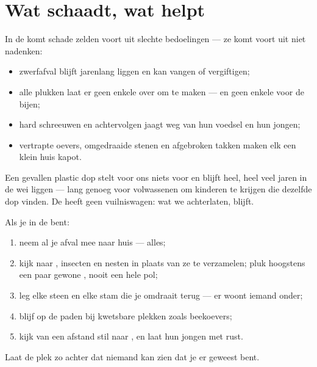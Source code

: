 \section{Wat schaadt, wat helpt}

\begin{proposition}\label{prop:g2:caring-for-nature:harm}
In de  komt schade zelden voort uit slechte bedoelingen --- ze
komt voort uit niet nadenken:
\begin{itemize}
  \item zwerfafval blijft jarenlang liggen en kan  vangen of vergiftigen;
  \item alle  plukken laat er geen enkele over om  te maken
        --- en geen enkele voor de bijen;
  \item hard schreeuwen en achtervolgen jaagt  weg van hun
        voedsel en hun jongen;
  \item vertrapte oevers, omgedraaide stenen en afgebroken takken maken
        elk een klein huis kapot.
\end{itemize}
\end{proposition}
\admitted

\begin{example}[De flesdop]\label{ex:g2:caring-for-nature:cap}
Een gevallen plastic dop stelt voor ons niets voor en blijft heel, heel
veel jaren in de wei liggen --- lang genoeg voor volwassenen om
kinderen te krijgen die dezelfde dop vinden. De  heeft geen
vuilniswagen: wat we achterlaten, blijft.
\end{example}

\begin{method}\label{met:g2:caring-for-nature:rules}
Als je in de  bent:
\begin{enumerate}
  \item neem al je afval mee naar huis --- alles;
  \item kijk naar , insecten en nesten in plaats van ze te
        verzamelen; pluk hoogstens een paar gewone , nooit een
        hele pol;
  \item leg elke steen en elke stam die je omdraait terug --- er woont
        iemand onder;
  \item blijf op de paden bij kwetsbare plekken zoals beekoevers;
  \item kijk van een afstand stil naar , en laat hun jongen met rust.
\end{enumerate}
Laat de plek zo achter dat niemand kan zien dat je er geweest bent.
\end{method}

